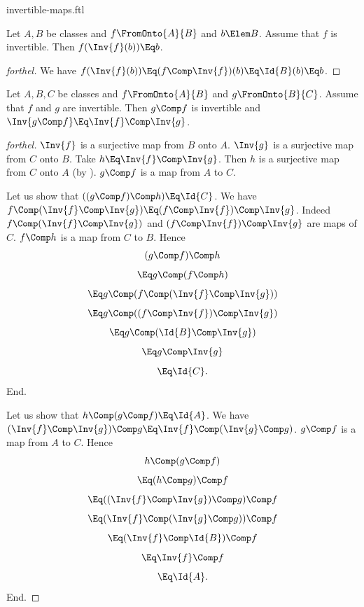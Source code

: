 \documentclass{stex}
\begin{document}
\begin{smodule}{invertible-maps.ftl}
\begin{proposition*}[forthel]
  Let $A, B$ be classes and $f \FromOnto{A}{B}$ and $b \Elem B$.
  Assume that $f$ is invertible.
  Then $f(\Inv{f}(b)) \Eq b$.
\end{proposition*}
\begin{proof}[forthel]
  We have
  $f(\Inv{f}(b))
    \Eq (f \Comp \Inv{f})(b)
    \Eq \Id{B}(b)
    \Eq b$.
\end{proof}

\begin{proposition*}[forthel,name=invertibility of composition of invertible maps]
  Let $A, B, C$ be classes and $f \FromOnto{A}{B}$ and $g \FromOnto{B}{C}$.
  Assume that $f$ and $g$ are invertible.
  Then $g \Comp f$ is invertible and $\Inv{g \Comp f} \Eq \Inv{f} \Comp \Inv{g}$.
\end{proposition*}
\begin{proof}[forthel]
  $\Inv{f}$ is a surjective map from $B$ onto $A$.
  $\Inv{g}$ is a surjective map from $C$ onto $B$.
  Take $h \Eq \Inv{f} \Comp \Inv{g}$.
  Then $h$ is a surjective map from $C$ onto $A$ (by ).
  $g \Comp f$ is a map from $A$ to $C$.

  Let us show that $((g \Comp f) \Comp h) \Eq \Id{C}$.
    We have $f \Comp (\Inv{f} \Comp \Inv{g}) \Eq (f \Comp \Inv{f}) \Comp \Inv{g}$.
    Indeed $f \Comp (\Inv{f} \Comp \Inv{g})$ and $(f \Comp \Inv{f}) \Comp \Inv{g}$ are maps of $C$.
    $f \Comp h$ is a map from $C$ to $B$.
    Hence
    \[  (g \Comp f) \Comp h                           \]
    \[    \Eq g \Comp (f \Comp h)                       \]
    \[    \Eq g \Comp (f \Comp (\Inv{f} \Comp \Inv{g}))   \]
    \[    \Eq g \Comp ((f \Comp \Inv{f}) \Comp \Inv{g})   \]
    \[    \Eq g \Comp (\Id{B} \Comp \Inv{g})            \]
    \[    \Eq g \Comp \Inv{g}                            \]
    \[    \Eq \Id{C}.                                  \]
  End.

  Let us show that $h \Comp (g \Comp f) \Eq \Id{A}$.
    We have $(\Inv{f} \Comp \Inv{g}) \Comp g \Eq \Inv{f} \Comp (\Inv{g} \Comp g)$.
    $g \Comp f$ is a map from $A$ to $C$.
    Hence
    \[  h \Comp (g \Comp f)                           \]
    \[    \Eq (h \Comp g) \Comp f                       \]
    \[    \Eq ((\Inv{f} \Comp \Inv{g}) \Comp g) \Comp f   \]
    \[    \Eq (\Inv{f} \Comp (\Inv{g} \Comp g)) \Comp f   \]
    \[    \Eq (\Inv{f} \Comp \Id{B}) \Comp f            \]
    \[    \Eq \Inv{f} \Comp f                            \]
    \[    \Eq \Id{A}.                                  \]
  End.


\end{proof}
\end{smodule}
\end{document}

